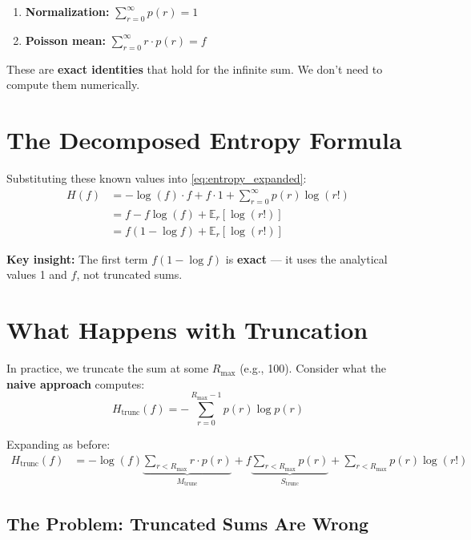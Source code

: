 \documentclass[11pt]{article}
\newcommand{\E}{\mathbb{E}}
\begin{document}
\begin{enumerate}
\item \textbf{Normalization:} $\displaystyle\sum_{r=0}^{\infty} p(r) = 1$

\item \textbf{Poisson mean:} $\displaystyle\sum_{r=0}^{\infty} r \cdot p(r) = f$
\end{enumerate}

These are \textbf{exact identities} that hold for the infinite sum. We don't need to compute them numerically.

\section{The Decomposed Entropy Formula}

Substituting these known values into \eqref{eq:entropy_expanded}:
\begin{align}
H(f) &= -\log(f) \cdot f + f \cdot 1 + \sum_{r=0}^{\infty} p(r) \log(r!) \\
&= f - f\log(f) + \E_r[\log(r!)] \\
&= \boxed{f(1 - \log f) + \E_r[\log(r!)]}
\label{eq:decomposed}
\end{align}

\textbf{Key insight:} The first term $f(1 - \log f)$ is \textbf{exact} --- it uses the analytical values 1 and $f$, not truncated sums.

\section{What Happens with Truncation}

In practice, we truncate the sum at some $R_{\max}$ (e.g., 100). Consider what the \textbf{naive approach} computes:
\begin{equation}
H_{\text{trunc}}(f) = -\sum_{r=0}^{R_{\max}-1} p(r) \log p(r)
\end{equation}

Expanding as before:
\begin{align}
H_{\text{trunc}}(f) &= -\log(f) \underbrace{\sum_{r < R_{\max}} r \cdot p(r)}_{M_{\text{trunc}}} + f \underbrace{\sum_{r < R_{\max}} p(r)}_{S_{\text{trunc}}} + \sum_{r < R_{\max}} p(r) \log(r!)
\end{align}

\subsection{The Problem: Truncated Sums Are Wrong}
\end{document}
